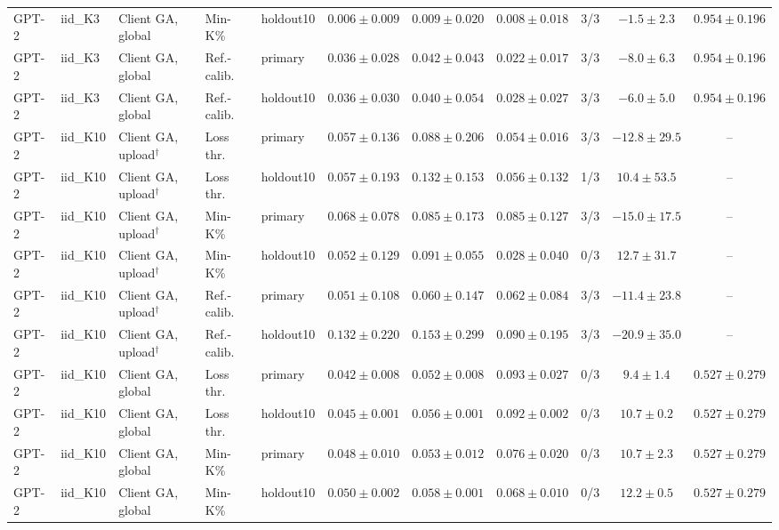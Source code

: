 \begin{table}[t]
\begin{tabular*}{\textwidth}{@{\extracolsep{\fill}}lllllcccccc@{}}
GPT-2 & iid\_K3 & Client GA, global & Min-K\% & holdout10 & $0.006 \pm 0.009$ & $0.009 \pm 0.020$ & $0.008 \pm 0.018$ & 3/3 & $-1.5 \pm 2.3$ & $0.954 \pm 0.196$ \\
GPT-2 & iid\_K3 & Client GA, global & Ref.-calib. & primary & $0.036 \pm 0.028$ & $0.042 \pm 0.043$ & $0.022 \pm 0.017$ & 3/3 & $-8.0 \pm 6.3$ & $0.954 \pm 0.196$ \\
GPT-2 & iid\_K3 & Client GA, global & Ref.-calib. & holdout10 & $0.036 \pm 0.030$ & $0.040 \pm 0.054$ & $0.028 \pm 0.027$ & 3/3 & $-6.0 \pm 5.0$ & $0.954 \pm 0.196$ \\
GPT-2 & iid\_K10 & Client GA, upload$^{\dagger}$ & Loss thr. & primary & $0.057 \pm 0.136$ & $0.088 \pm 0.206$ & $0.054 \pm 0.016$ & 3/3 & $-12.8 \pm 29.5$ & -- \\
GPT-2 & iid\_K10 & Client GA, upload$^{\dagger}$ & Loss thr. & holdout10 & $0.057 \pm 0.193$ & $0.132 \pm 0.153$ & $0.056 \pm 0.132$ & 1/3 & $10.4 \pm 53.5$ & -- \\
GPT-2 & iid\_K10 & Client GA, upload$^{\dagger}$ & Min-K\% & primary & $0.068 \pm 0.078$ & $0.085 \pm 0.173$ & $0.085 \pm 0.127$ & 3/3 & $-15.0 \pm 17.5$ & -- \\
GPT-2 & iid\_K10 & Client GA, upload$^{\dagger}$ & Min-K\% & holdout10 & $0.052 \pm 0.129$ & $0.091 \pm 0.055$ & $0.028 \pm 0.040$ & 0/3 & $12.7 \pm 31.7$ & -- \\
GPT-2 & iid\_K10 & Client GA, upload$^{\dagger}$ & Ref.-calib. & primary & $0.051 \pm 0.108$ & $0.060 \pm 0.147$ & $0.062 \pm 0.084$ & 3/3 & $-11.4 \pm 23.8$ & -- \\
GPT-2 & iid\_K10 & Client GA, upload$^{\dagger}$ & Ref.-calib. & holdout10 & $0.132 \pm 0.220$ & $0.153 \pm 0.299$ & $0.090 \pm 0.195$ & 3/3 & $-20.9 \pm 35.0$ & -- \\
GPT-2 & iid\_K10 & Client GA, global & Loss thr. & primary & $0.042 \pm 0.008$ & $0.052 \pm 0.008$ & $0.093 \pm 0.027$ & 0/3 & $9.4 \pm 1.4$ & $0.527 \pm 0.279$ \\
GPT-2 & iid\_K10 & Client GA, global & Loss thr. & holdout10 & $0.045 \pm 0.001$ & $0.056 \pm 0.001$ & $0.092 \pm 0.002$ & 0/3 & $10.7 \pm 0.2$ & $0.527 \pm 0.279$ \\
GPT-2 & iid\_K10 & Client GA, global & Min-K\% & primary & $0.048 \pm 0.010$ & $0.053 \pm 0.012$ & $0.076 \pm 0.020$ & 0/3 & $10.7 \pm 2.3$ & $0.527 \pm 0.279$ \\
GPT-2 & iid\_K10 & Client GA, global & Min-K\% & holdout10 & $0.050 \pm 0.002$ & $0.058 \pm 0.001$ & $0.068 \pm 0.010$ & 0/3 & $12.2 \pm 0.5$ & $0.527 \pm 0.279$ \\

\end{tabular*}
\end{table}
